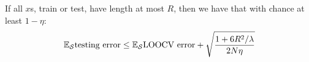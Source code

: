         If all $x$s, train or test, have length at most $R$, then
        we have that with chance at least $1-\eta$:
        $$
            \mathbb{E}_{\mathcal{S}}
            \text{testing error}
            \leq
            \mathbb{E}_{\mathcal{S}}
            \text{LOOCV error}
            +
            \sqrt{\frac{1+6R^2/\lambda}{2N\eta}}
        $$







      \newpage

